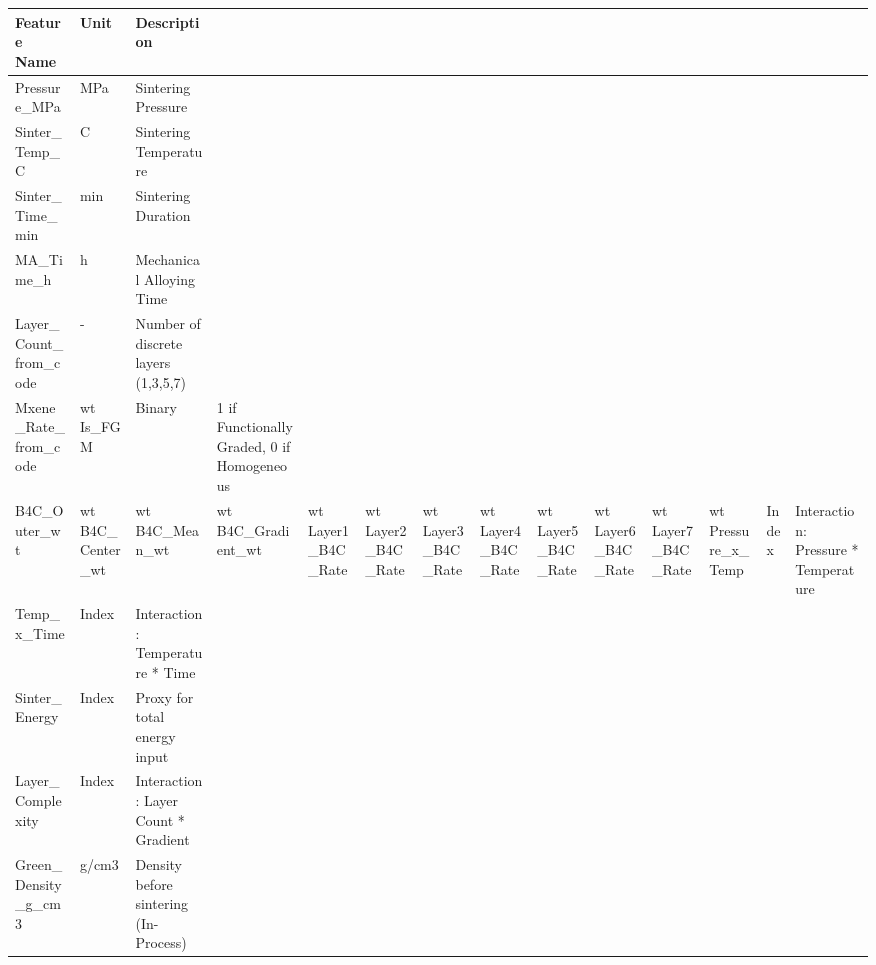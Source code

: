 \begin{tabular}{l l p{8cm}}
\toprule
Feature Name & Unit & Description \\
\midrule
Pressure_MPa & MPa & Sintering Pressure \\
Sinter_Temp_C & C & Sintering Temperature \\
Sinter_Time_min & min & Sintering Duration \\
MA_Time_h & h & Mechanical Alloying Time \\
Layer_Count_from_code & - & Number of discrete layers (1,3,5,7) \\
Mxene_Rate_from_code & wt%
Is_FGM & Binary & 1 if Functionally Graded, 0 if Homogeneous \\
B4C_Outer_wt & wt%
B4C_Center_wt & wt%
B4C_Mean_wt & wt%
B4C_Gradient_wt & wt%
Layer1_B4C_Rate & wt%
Layer2_B4C_Rate & wt%
Layer3_B4C_Rate & wt%
Layer4_B4C_Rate & wt%
Layer5_B4C_Rate & wt%
Layer6_B4C_Rate & wt%
Layer7_B4C_Rate & wt%
Pressure_x_Temp & Index & Interaction: Pressure * Temperature \\
Temp_x_Time & Index & Interaction: Temperature * Time \\
Sinter_Energy & Index & Proxy for total energy input \\
Layer_Complexity & Index & Interaction: Layer Count * Gradient \\
Green_Density_g_cm3 & g/cm3 & Density before sintering (In-Process) \\
\bottomrule
\end{tabular}
